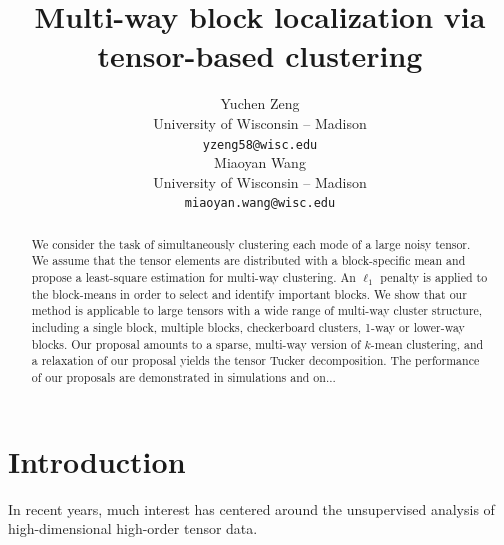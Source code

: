 \documentclass{article}
\title{Multi-way block localization via tensor-based clustering}
\author{%
Yuchen Zeng \\
 University of Wisconsin -- Madison\\
 \texttt{yzeng58@wisc.edu} \\
\And
Miaoyan Wang \\
 University of Wisconsin -- Madison\\
\texttt{miaoyan.wang@wisc.edu} \\
}
\begin{document}
\maketitle

\begin{abstract}
We consider the task of simultaneously clustering each mode of a large noisy tensor. We assume that the tensor elements are distributed with a block-specific mean and propose a least-square estimation for multi-way clustering. An $\ell_1$ penalty is applied to the block-means in order to select and identify important blocks. We show that our method is applicable to large tensors with a wide range of multi-way cluster structure, including a single block, multiple blocks, checkerboard clusters, 1-way or lower-way blocks. Our proposal amounts to a sparse, multi-way version of $k$-mean clustering, and a relaxation of our proposal yields the tensor Tucker decomposition. The performance of our proposals are demonstrated in simulations and on... 
\end{abstract}

\section{Introduction}
In recent years, much interest has centered around the unsupervised analysis of high-dimensional high-order tensor data. 
\end{document}
